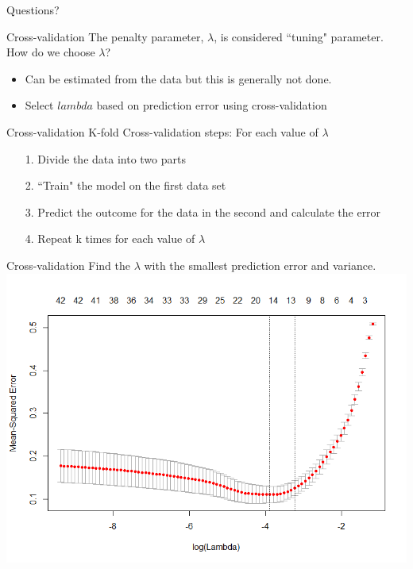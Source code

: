 \documentclass{beamer}\usepackage[]{graphicx}\usepackage[]{color}
\begin{document}
\begin{frame}
Questions?
\end{frame}

\begin{frame}{Cross-validation}
The penalty parameter, $\lambda$, is considered ``tuning" parameter.\\
How do we choose $\lambda$?
\pause
\bigskip
\begin{itemize}
\item Can be estimated from the data but this is generally not done.
\item Select $lambda$ based on prediction error using cross-validation
\end{itemize}
\end{frame}

\begin{frame}{Cross-validation}
K-fold Cross-validation steps:
\bigskip
For each value of $\lambda$
\begin{itemize}
\item[1.] Divide the data into two parts
\item[2.] ``Train" the model on the first data set
\item[3.] Predict the outcome for the data in the second and calculate the error
\item[4.] Repeat k times for each value of $\lambda $
\end{itemize}
\end{frame}

\begin{frame}{Cross-validation}
Find the $\lambda$ with the smallest prediction error and variance.\\
\includegraphics[scale=.38]{ExampleCVplot}\\
\end{frame}
\end{document}
